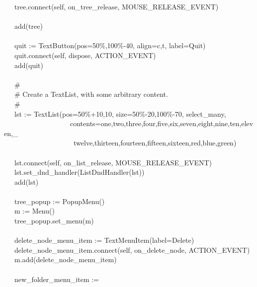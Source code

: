 {\>   \ \ \ tree.connect(self,
{\textquotedbl}on\_tree\_release{\textquotedbl},
MOUSE\_RELEASE\_EVENT) \\
\ \\
\>   \ \ \ add(tree) \\
\ \\
\>   \ \ \ quit :=
TextButton({\textquotedbl}pos=50\%,100\%-40{\textquotedbl},
{\textquotedbl}align=c,t{\textquotedbl},
{\textquotedbl}label=Quit{\textquotedbl}) \\
\>   \ \ \ quit.connect(self, {\textquotedbl}dispose{\textquotedbl},
ACTION\_EVENT) \\
\>   \ \ \ add(quit) \\
\ \\
\>   \ \ \ \# \\
\>   \ \ \ \# Create a TextList, with some arbitrary content. \\
\>   \ \ \ \# \\
\>   \ \ \ lst :=
TextList({\textquotedbl}pos=50\%+10,10{\textquotedbl},
{\textquotedbl}size=50\%-20,100\%-70{\textquotedbl},
{\textquotedbl}select\_many{\textquotedbl}, \\
\>   \ \ \ \ \ \ \ \ \ \ \ \ \ \ \ \ \ \ \ {\textquotedbl}contents=one,two,three,four,five,six,seven,eight,nine,ten,eleven,\_ \\
\>   \ \ \ \ \ \ \ \ \ \ \ \ \ \ \ \ \ \ \ \ twelve,thirteen,fourteen,fifteen,sixteen,red,blue,green{\textquotedbl}) \\
\ \\
\>   \ \ \ lst.connect(self,
{\textquotedbl}on\_list\_release{\textquotedbl},
MOUSE\_RELEASE\_EVENT) \\
\>   \ \ \ lst.set\_dnd\_handler(ListDndHandler(lst)) \\
\>   \ \ \ add(lst) \\
\ \\
\>   \ \ \ tree\_popup := PopupMenu() \\
\>   \ \ \ m := Menu() \\
\>   \ \ \ tree\_popup.set\_menu(m) \\
\ \\
\>   \ \ \ delete\_node\_menu\_item :=
TextMenuItem({\textquotedbl}label=Delete{\textquotedbl}) \\
\>   \ \ \ delete\_node\_menu\_item.connect(self,
{\textquotedbl}on\_delete\_node{\textquotedbl}, ACTION\_EVENT) \\
\>   \ \ \ m.add(delete\_node\_menu\_item) \\
\ \\
\>   \ \ \ new\_folder\_menu\_item :=
}
